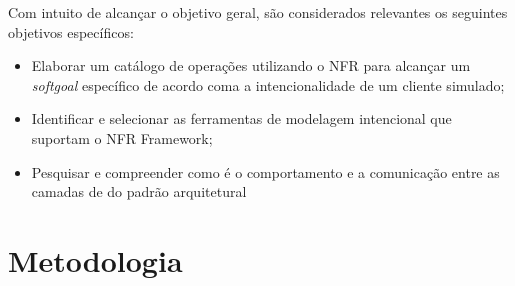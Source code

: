 Com intuito de alcançar o objetivo geral, são considerados relevantes os seguintes objetivos específicos:

\begin{itemize}
	
	\item Elaborar um catálogo de operações utilizando o NFR para alcançar um \textit{softgoal} específico de acordo coma a intencionalidade de um cliente simulado;
	
	\item Identificar e selecionar as ferramentas de modelagem intencional que suportam o NFR Framework;
	
	\item Pesquisar e compreender como é o comportamento e a comunicação entre as camadas de do padrão arquitetural 
\end{itemize}

\chapter{Metodologia}